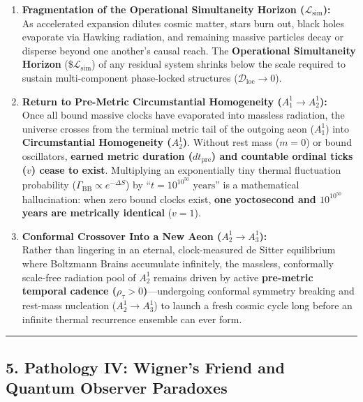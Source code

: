 \documentclass[
]{article}
\providecommand{\tightlist}{%
  \setlength{\itemsep}{0pt}\setlength{\parskip}{0pt}}
\begin{document}
\begin{enumerate}
\def\labelenumi{\arabic{enumi}.}
\tightlist
\item
  \textbf{Fragmentation of the Operational Simultaneity Horizon
  (\(\mathcal{L}_{\mathrm{sim}}\)):}\\
  As accelerated expansion dilutes cosmic matter, stars burn out, black
  holes evaporate via Hawking radiation, and remaining massive particles
  decay or disperse beyond one another's causal reach. The
  \textbf{Operational Simultaneity Horizon}
  (\(\$\mathcal{L}_{\mathrm{sim}}\)) of any residual system shrinks
  below the scale required to sustain multi-component phase-locked
  structures (\(\mathcal{D}_{\mathrm{loc}} \to 0\)).
\item
  \textbf{Return to Pre-Metric Circumstantial Homogeneity
  (\(A_1^1 \to A_2^1\)):}\\
  Once all bound massive clocks have evaporated into massless radiation,
  the universe crosses from the terminal metric tail of the outgoing
  aeon (\(A_1^1\)) into \textbf{Circumstantial Homogeneity (\(A_2^1\))}.
  Without rest mass (\(m = 0\)) or bound oscillators, \textbf{earned
  metric duration (\(dt_{\mathrm{pre}}\)) and countable ordinal ticks
  (\(v\)) cease to exist}. Multiplying an exponentially tiny thermal
  fluctuation probability
  (\(\Gamma_{\mathrm{BB}} \propto e^{-\Delta S}\)) by
  ``\(t = 10^{10^{50}}\text{ years}\)'' is a mathematical hallucination:
  when zero bound clocks exist, \textbf{one yoctosecond and
  \(10^{10^{50}}\) years are metrically identical} (\(v = 1\)).
\item
  \textbf{Conformal Crossover Into a New Aeon (\(A_2^1 \to A_3^1\)):}\\
  Rather than lingering in an eternal, clock-measured de Sitter
  equilibrium where Boltzmann Brains accumulate infinitely, the
  massless, conformally scale-free radiation pool of \(A_2^1\) remains
  driven by active \textbf{pre-metric temporal cadence
  (\(\rho_\tau > 0\))}---undergoing conformal symmetry breaking and
  rest-mass nucleation (\(A_2^1 \to A_3^1\)) to launch a fresh cosmic
  cycle long before an infinite thermal recurrence ensemble can ever
  form.
\end{enumerate}

\begin{center}\rule{0.5\linewidth}{0.5pt}\end{center}

\subsection{5. Pathology IV: Wigner's Friend and Quantum Observer
Paradoxes}\label{pathology-iv-wigners-friend-and-quantum-observer-paradoxes}
\end{document}
